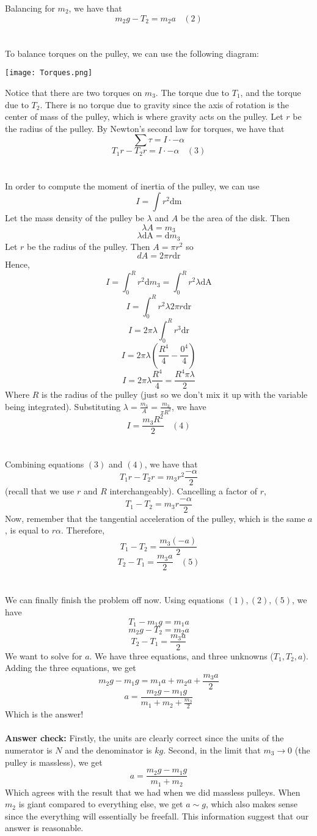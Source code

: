 \documentclass[11pt]{scrartcl}
\begin{document}
\begin{soln}
  Balancing for $m_2$, we have that
  $$m_2g-T_2=m_2 a~~~~(2)$$
  \\ \\
  To balance torques on the pulley, we can use the following diagram:
  \begin{center}
    \texttt{[image: Torques.png]}
  \end{center}
  Notice that there are two torques on $m_3$. The torque due to $T_1$, and
  the torque due to $T_2$. There is no torque due to gravity since the axis of rotation
  is the center of mass of the pulley, which is where gravity acts on the pulley.
  Let $r$ be the radius of the pulley. By Newton's second law for torques, we have that
  $$\sum \tau = I\cdot -\alpha$$
  $$T_1r-T_2r=I\cdot -\alpha~~~~(3)$$
  \\ \\
  In order to compute the moment of inertia of the pulley, we can use
  $$I=\int r^2 \mathrm{dm}$$
  Let the mass density of the pulley be $\lambda$ and $A$ be the area of the disk. Then
  $$\lambda A=m_3$$
  $$\lambda \mathrm{dA}=\mathrm{d}m_3$$
  Let $r$ be the radius of the pulley. Then $A=\pi r^2$ so
  $$dA=2\pi r\mathrm{dr}$$
  Hence,
  $$I=\int_0^R r^2\mathrm{d}m_3=\int_0^R r^2 \lambda \mathrm{dA}$$
  $$I=\int_0^R r^2\lambda 2\pi r\mathrm{dr}$$
  $$I=2\pi \lambda \int_0^R r^3\mathrm{dr}$$
  $$I=2\pi \lambda \left(\frac{R^4}{4}-\frac{0^4}{4}\right)$$
  $$I=2\pi \lambda \frac{R^4}{4}=\frac{R^4\pi \lambda}{2}$$
  Where $R$ is the radius of the pulley (just so we don't mix it up with the variable being integrated).
  Substituting $\lambda = \frac{m_3}{A}=\frac{m_3}{\pi R^2}$, we have
  $$I=\frac{m_3R^2}{2}~~~~(4)$$
  \\ \\
  Combining equations $(3)$ and $(4)$, we have that
  $$T_1r-T_2r=m_3 r^2\frac{-\alpha}{2}$$
  (recall that we use $r$ and $R$ interchangeably). Cancelling a factor of $r$,
  $$T_1-T_2=m_3 r\frac{-\alpha}{2}$$
  Now, remember that the tangential acceleration of the pulley, which is the same $a$, is
  equal to $r\alpha$. Therefore,
  $$T_1-T_2= \frac{m_3 (-a)}{2}$$
  $$T_2-T_1= \frac{m_3 a}{2}~~~~(5)$$
  \\ \\
  We can finally finish the problem off now. Using equations $(1), (2), (5)$, we have
  $$T_1-m_1g=m_1a$$
  $$m_2g-T_2=m_2a$$
  $$T_2-T_1=\frac{m_3 a}{2}$$
  We want to solve for $a$. We have three equations, and three unknowns ($T_1, T_2, a$).
  Adding the three equations, we get
  $$m_2g-m_1g=m_1a+m_2a+\frac{m_3 a}{2}$$
  $$a=\frac{m_2g-m_1g}{m_1+m_2+\frac{m_3}{2}}$$
  Which is the answer!
  \\ \\
  \textbf{Answer check: } Firstly, the units are clearly correct since
  the units of the numerator is $N$ and the denominator is $kg$. Second,
  in the limit that $m_3\to 0$ (the pulley is massless), we get
  $$a=\frac{m_2g-m_1g}{m_1+m_2}$$
  Which agrees with the result that we had when we did massless pulleys.
  When $m_2$ is giant compared to everything else, we get $a\sim g$, which also makes sense
  since the everything will essentially be freefall. This information suggest that
  our answer is reasonable.
\end{soln}
\end{document}
